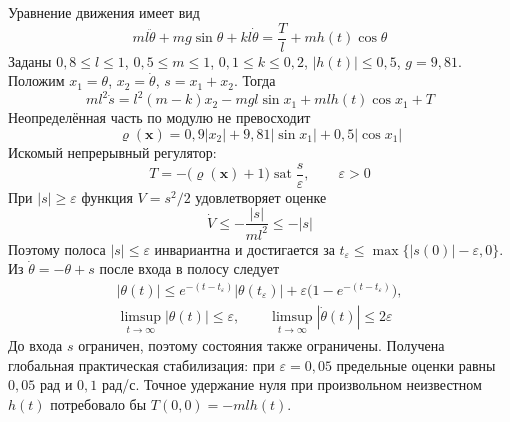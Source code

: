 Уравнение движения имеет вид
\begin{equation}
  ml\ddot\theta+mg\sin\theta+kl\dot\theta
  =\frac{T}{l}+mh(t)\cos\theta
\end{equation}
Заданы $0{,}8\le l\le1$, $0{,}5\le m\le1$,
$0{,}1\le k\le0{,}2$, $|h(t)|\le0{,}5$, $g=9{,}81$.
Положим $x_1=\theta$, $x_2=\dot\theta$, $s=x_1+x_2$. Тогда
\begin{equation}
  ml^2\dot s=l^2(m-k)x_2-mgl\sin x_1+mlh(t)\cos x_1+T
\end{equation}
Неопределённая часть по модулю не превосходит
\begin{equation}
  \varrho(\bm x)=0{,}9|x_2|+9{,}81|\sin x_1|+0{,}5|\cos x_1|
\end{equation}
Искомый непрерывный регулятор:
\begin{equation}
  T=-\bigl(\varrho(\bm x)+1\bigr)
       \operatorname{sat}\frac{s}{\varepsilon},\qquad \varepsilon>0
\end{equation}
При $|s|\ge\varepsilon$ функция $V=s^2/2$ удовлетворяет оценке
\begin{equation}
  \dot V\le-\frac{|s|}{ml^2}\le-|s|
\end{equation}
Поэтому полоса $|s|\le\varepsilon$ инвариантна и достигается за
$t_\varepsilon\le\max\{|s(0)|-\varepsilon,0\}$.
Из $\dot\theta=-\theta+s$ после входа в полосу следует
\begin{equation}
  \begin{gathered}
    |\theta(t)|\le e^{-(t-t_\varepsilon)}|\theta(t_\varepsilon)|
       +\varepsilon\bigl(1-e^{-(t-t_\varepsilon)}\bigr),\\
    \limsup_{t\to\infty}|\theta(t)|\le\varepsilon,\qquad
    \limsup_{t\to\infty}|\dot\theta(t)|\le2\varepsilon
  \end{gathered}
\end{equation}
До входа $s$ ограничен, поэтому состояния также ограничены.
Получена глобальная практическая стабилизация: при
$\varepsilon=0{,}05$ предельные оценки равны $0{,}05$ рад
и $0{,}1$ рад/с. Точное удержание нуля при произвольном неизвестном
$h(t)$ потребовало бы $T(0,0)=-mlh(t)$.
